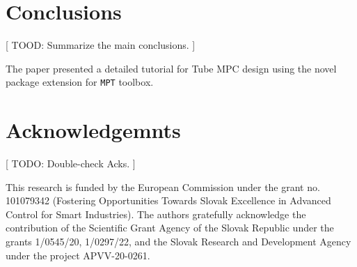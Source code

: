 \documentclass[letterpaper, 10 pt, conference]{ieeeconf}
\begin{document}
\section{Conclusions}
\label{sec:conclusions}

[ TOOD: Summarize the main conclusions. ]

The paper presented a detailed tutorial for Tube MPC design using the novel package extension for \texttt{MPT} toolbox. 

\addtolength{\textheight}{-12cm}

\section*{Acknowledgemnts}

[ TODO: Double-check Acks. ]

This research is funded by the European Commission under the grant no. 101079342 (Fostering Opportunities Towards Slovak Excellence in Advanced Control for Smart Industries). The authors gratefully acknowledge the contribution of the Scientific Grant Agency of the Slovak Republic under the grants 1/0545/20, 1/0297/22, and the Slovak Research and Development Agency under the project APVV-20-0261. 




\end{document}
